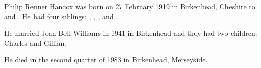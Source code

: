 
Philip Renner Hancox was born on 27 February 1919 in	Birkenhead, Cheshire to  and \cite{PRHancoxBirth}.
He had four siblings: , , , and .

He married Joan Bell Williams in 1941 in Birkenhead \cite{PRHancoxMarriage} and they had two children: Charles and Gillian.

He died in the second quarter of 1983 in Birkenhead, Merseyside.\cite{PRHancoxDeath}
